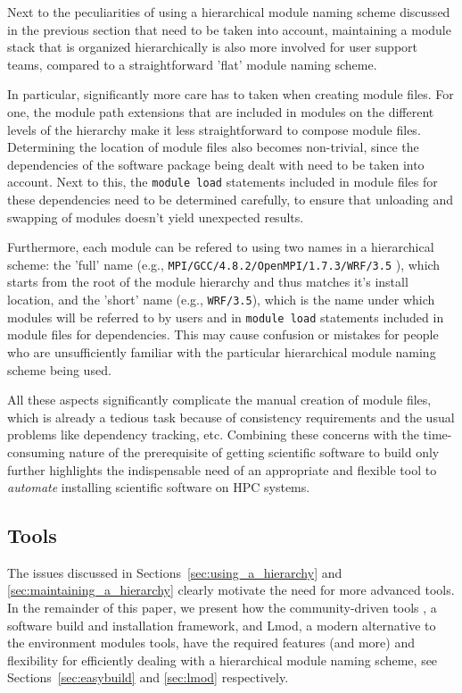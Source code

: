 Next to the peculiarities of using a hierarchical module naming scheme discussed in
the previous section that need to be taken into account, maintaining a module stack
that is organized hierarchically is also more involved for user support teams,
compared to a straightforward 'flat' module naming scheme.

In particular, significantly more care has to taken when creating
module files. For one, the module path extensions that are included in modules
on the different levels of the hierarchy make it less straightforward to compose
module files. Determining the location of module files also becomes
non-trivial, since the dependencies of the software package being dealt with need
to be taken into account. Next to this, the \texttt{module load} statements included
in module files for these dependencies need to be determined carefully, to ensure
that unloading and swapping of modules doesn't yield unexpected results.

Furthermore, each module can be refered to using two names in a hierarchical scheme:
the 'full' name (e.g., \texttt{MPI/GCC/4.8.2/OpenMPI/1.7.3/WRF/3.5}
), which
starts from the root of the module hierarchy and thus matches it's install location,
and the 'short' name (e.g., \texttt{WRF/3.5}), which is the name under which modules
will be referred to by users and in \texttt{module load} statements included in
module files for dependencies. This may cause confusion or mistakes for people who
are unsufficiently familiar with the particular hierarchical module naming scheme
being used.




All these aspects significantly complicate the manual creation of module files, which
is already a tedious task because of consistency requirements and the usual problems
like dependency tracking, etc. Combining these concerns with the time-consuming
nature of the prerequisite of getting scientific software to build only further
highlights the indispensable need of an appropriate and flexible tool to
\emph{automate} installing scientific software on HPC systems.

\subsection{Tools}
\label{sec:tools_for_hierarchical}

The issues discussed in Sections~\ref{sec:using_a_hierarchy} and
\ref{sec:maintaining_a_hierarchy} clearly motivate the need for more advanced tools.
In the remainder of this paper, we present how the community-driven tools
\easybuild{}, a software build and installation framework, and Lmod, a modern
alternative to the environment modules tools, have the required features (and more)
and flexibility for efficiently dealing with a hierarchical module naming scheme,
see Sections~\ref{sec:easybuild} and \ref{sec:lmod} respectively.
